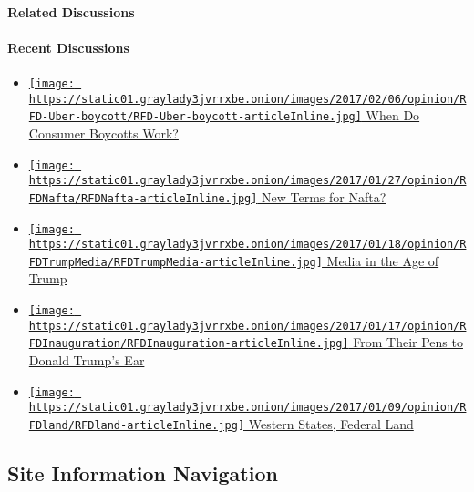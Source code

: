 \hypertarget{related-discussions}{%
\paragraph{Related Discussions}\label{related-discussions}}

\hypertarget{recent-discussions}{%
\paragraph{Recent Discussions}\label{recent-discussions}}

\begin{itemize}
\tightlist
\item
  \href{../../../../2017/02/07/when-do-consumer-boycotts-work}{\texttt{[image: https://static01.graylady3jvrrxbe.onion/images/2017/02/06/opinion/RFD-Uber-boycott/RFD-Uber-boycott-articleInline.jpg]}
  When Do Consumer Boycotts Work?}
\item
  \href{../../../../2017/01/30/new-terms-for-nafta-7}{\texttt{[image: https://static01.graylady3jvrrxbe.onion/images/2017/01/27/opinion/RFDNafta/RFDNafta-articleInline.jpg]}
  New Terms for Nafta?}
\item
  \href{../../../../2017/01/19/media-in-the-age-of-trump}{\texttt{[image: https://static01.graylady3jvrrxbe.onion/images/2017/01/18/opinion/RFDTrumpMedia/RFDTrumpMedia-articleInline.jpg]}
  Media in the Age of Trump}
\item
  \href{../../../../2017/01/18/from-their-pens-to-donald-trumps-ear}{\texttt{[image: https://static01.graylady3jvrrxbe.onion/images/2017/01/17/opinion/RFDInauguration/RFDInauguration-articleInline.jpg]}
  From Their Pens to Donald Trump's Ear}
\item
  \href{../../../../2017/01/17/can-western-states-afford-a-federal-land-transfer}{\texttt{[image: https://static01.graylady3jvrrxbe.onion/images/2017/01/09/opinion/RFDland/RFDland-articleInline.jpg]}
  Western States, Federal Land}
\end{itemize}

\hypertarget{site-information-navigation}{%
\subsection{Site Information
Navigation}\label{site-information-navigation}}

